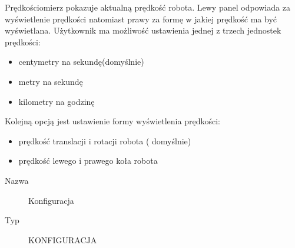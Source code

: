 \documentclass[eng,printmode]{mgr}
\begin{document}
Prędkościomierz pokazuje aktualną prędkość robota. Lewy panel odpowiada za wyświetlenie prędkości natomiast prawy za formę w jakiej prędkość ma być wyświetlana. Użytkownik ma możliwość ustawienia jednej z trzech jednostek prędkości:
\begin{itemize}
 \item centymetry na sekundę(domyślnie)
 \item metry na sekundę 
 \item kilometry na godzinę
\end{itemize}
Kolejną opcją jest ustawienie formy wyświetlenia prędkości:
\begin{itemize}
 \item prędkość translacji i rotacji robota ( domyślnie)
 \item prędkość lewego i prawego koła robota
\end{itemize}

\newpage
\begin{description}
  \item[Nazwa] Konfiguracja
  \item[Typ] KONFIGURACJA
\end{description}
\end{document}
